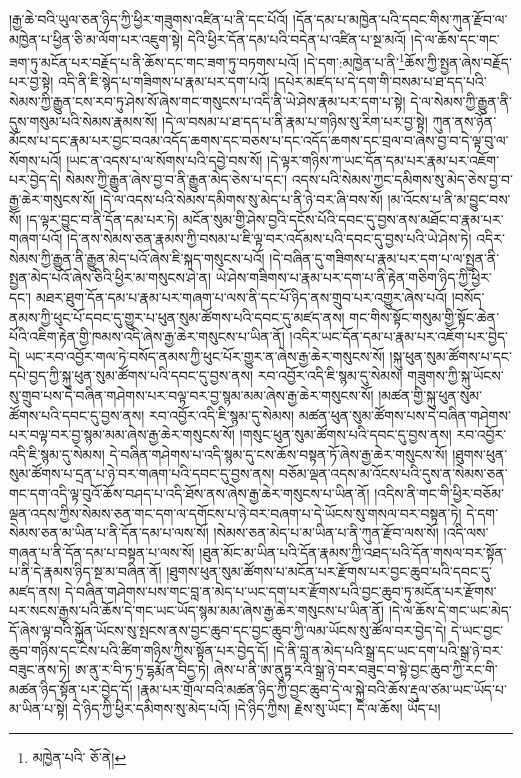 །རྒྱ་ཆེ་བའི་ཡུལ་ཅན་ཉིད་ཀྱི་ཕྱིར་གཟུགས་འཛིན་པ་ནི་དང་པོའོ། །དོན་དམ་པ་མཁྱེན་པའི་དབང་གིས་ཀུན་རྫོབ་ལ་མཁྱེན་པ་ཕྱིན་ཅི་མ་ལོག་པར་འཇུག་སྟེ། དེའི་ཕྱིར་དོན་དམ་པའི་བདེན་པ་འཛིན་པ་སྔ་མའོ། །དེ་ལ་ཆོས་དང་གང་ཟག་ཏུ་མངོན་པར་བརྗོད་པ་ནི་ཆོས་དང་གང་ཟག་ཏུ་བཏགས་པའོ། །དེ་དག་:མཁྱེན་པ་ནི་\footnote{མཁྱེན་པའི་  ཅོ་ནེ། }ཆོས་ཀྱི་སྤྱན་ཞེས་བརྗོད་པར་བྱ་སྟེ། འདི་ནི་ཇི་སྙེད་པ་གཟིགས་པ་རྣམ་པར་དག་པའོ། །དཔེར་མཛད་པ་དེ་དག་གི་བསམ་པ་ཐ་དད་པའི་སེམས་ཀྱི་རྒྱུན་ངས་རབ་ཏུ་ཤེས་སོ་ཞེས་གང་གསུངས་པ་འདི་ནི་ཡེ་ཤེས་རྣམ་པར་དག་པ་སྟེ། དེ་ལ་སེམས་ཀྱི་རྒྱུན་ནི་དུས་གསུམ་པའི་སེམས་རྣམས་སོ། །དེ་ལ་བསམ་པ་ཐ་དད་པ་ནི་རྣམ་པ་གཉིས་སུ་རིག་པར་བྱ་སྟེ། ཀུན་ནས་ཉོན་མོངས་པ་དང་རྣམ་པར་བྱང་བའམ་འདོད་ཆགས་དང་བཅས་པ་དང་འདོད་ཆགས་དང་བྲལ་བ་ཞེས་བྱ་བ་དེ་ལྟ་བུ་ལ་སོགས་པའོ། །ཡང་ན་འདས་པ་ལ་སོགས་པའི་དབྱེ་བས་སོ། །དེ་ལྟར་གཉིས་ཀ་ཡང་དོན་དམ་པར་རྣམ་པར་འཇོག་པར་བྱེད་དེ། སེམས་ཀྱི་རྒྱུན་ཞེས་བྱ་བ་ནི་རྒྱུན་མེད་ཅེས་པ་དང་། འདས་པའི་སེམས་ཀྱང་དམིགས་སུ་མེད་ཅེས་བྱ་བ་རྒྱ་ཆེར་གསུངས་སོ། །དེ་ལ་འདས་པའི་སེམས་དམིགས་སུ་མེད་པ་ནི་ཉེ་བར་ཞི་བས་སོ། །མ་འོངས་པ་ནི་མ་བྱུང་བས་སོ། །ད་ལྟར་བྱུང་བ་ནི་དོན་དམ་པར་ཏེ། མངོན་སུམ་གྱི་ཤེས་བྱའི་དངོས་པོའི་དབང་དུ་བྱས་ནས་མཐོང་བ་རྣམ་པར་གཞག་པའོ། །དེ་ནས་སེམས་ཅན་རྣམས་ཀྱི་བསམ་པ་ཇི་ལྟ་བར་འདོམས་པའི་དབང་དུ་བྱས་པའི་ཡེ་ཤེས་ཏེ། འདིར་སེམས་ཀྱི་རྒྱུན་ནི་རྒྱུན་མེད་པའོ་ཞེས་ཇི་སྐད་གསུངས་པའོ། །དེ་བཞིན་དུ་གཟིགས་པ་རྣམ་པར་དག་པ་ལ་སྤྱན་ནི་སྤྱན་མེད་པའོ་ཞེས་ཅིའི་ཕྱིར་མ་གསུངས་ཤེ་ན། ཡེ་ཤེས་གཟིགས་པ་རྣམ་པར་དག་པ་ནི་རྟེན་གཅིག་ཉིད་ཀྱི་ཕྱིར་དང་། མཐར་ཐུག་དོན་དམ་པ་རྣམ་པར་གཞག་པ་ལས་ནི་དང་པོ་ཉིད་ནས་གྲུབ་པར་འགྱུར་ཞེས་པའོ། །བསོད་ནམས་ཀྱི་ཕུང་པོ་དབང་དུ་གྱུར་པ་ཕུན་སུམ་ཚོགས་པའི་དབང་དུ་མཛད་ནས། གང་གིས་སྟོང་གསུམ་གྱི་སྟོང་ཆེན་པོའི་འཇིག་རྟེན་གྱི་ཁམས་འདི་ཞེས་རྒྱ་ཆེར་གསུངས་པ་ཡིན་ནོ། །འདིར་ཡང་དོན་དམ་པ་རྣམ་པར་འཇོག་པར་བྱེད་དེ། ཡང་རབ་འབྱོར་གལ་ཏེ་བསོད་ནམས་ཀྱི་ཕུང་པོར་གྱུར་ན་ཞེས་རྒྱ་ཆེར་གསུངས་སོ། །སྐུ་ཕུན་སུམ་ཚོགས་པ་དང་དཔེ་བྱད་ཀྱི་སྐུ་ཕུན་སུམ་ཚོགས་པའི་དབང་དུ་བྱས་ནས། རབ་འབྱོར་འདི་ཇི་སྙམ་དུ་སེམས། གཟུགས་ཀྱི་སྐུ་ཡོངས་སུ་གྲུབ་པས་དེ་བཞིན་གཤེགས་པར་བལྟ་བར་བྱ་སྙམ་མམ་ཞེས་རྒྱ་ཆེར་གསུངས་སོ། །མཚན་གྱི་སྐུ་ཕུན་སུམ་ཚོགས་པའི་དབང་དུ་བྱས་ནས། རབ་འབྱོར་འདི་ཇི་སྙམ་དུ་སེམས། མཚན་ཕུན་སུམ་ཚོགས་པས་དེ་བཞིན་གཤེགས་པར་བལྟ་བར་བྱ་སྙམ་མམ་ཞེས་རྒྱ་ཆེར་གསུངས་སོ། །གསུང་ཕུན་སུམ་ཚོགས་པའི་དབང་དུ་བྱས་ནས། རབ་འབྱོར་འདི་ཇི་སྙམ་དུ་སེམས། དེ་བཞིན་གཤེགས་པ་འདི་སྙམ་དུ་ངས་ཆོས་བསྟན་ཏོ་ཞེས་རྒྱ་ཆེར་གསུངས་སོ། །ཐུགས་ཕུན་སུམ་ཚོགས་པ་དྲན་པ་ཉེ་བར་གཞག་པའི་དབང་དུ་བྱས་ནས། བཅོམ་ལྡན་འདས་མ་འོངས་པའི་དུས་ན་སེམས་ཅན་གང་དག་འདི་ལྟ་བུའོ་ཆོས་བཤད་པ་འདི་ཐོས་ནས་ཞེས་རྒྱ་ཆེར་གསུངས་པ་ཡིན་ནོ། །འདིས་ནི་གང་གི་ཕྱིར་བཅོམ་ལྡན་འདས་ཀྱིས་སེམས་ཅན་གང་དག་ལ་དགོངས་པ་ཉེ་བར་བཞག་པ་དེ་ཡོངས་སུ་གསལ་བར་བསྟན་ཏེ། དེ་དག་སེམས་ཅན་མ་ཡིན་པ་ནི་དོན་དམ་པ་ལས་སོ། །སེམས་ཅན་མེད་པ་མ་ཡིན་པ་ནི་ཀུན་རྫོབ་ལས་སོ། །འདི་ལས་གཞན་པ་ནི་དོན་དམ་པ་བསྟན་པ་ལས་སོ། །ཐུན་མོང་མ་ཡིན་པའི་དོན་རྣམས་ཀྱི་འཐད་པའི་དོན་གསལ་བར་སྟོན་པ་ནི་དེ་རྣམས་ཉིད་སྔ་མ་བཞིན་ནོ། །ཐུགས་ཕུན་སུམ་ཚོགས་པ་མངོན་པར་རྫོགས་པར་བྱང་ཆུབ་པའི་དབང་དུ་མཛད་ནས། དེ་བཞིན་གཤེགས་པས་གང་བླ་ན་མེད་པ་ཡང་དག་པར་རྫོགས་པའི་བྱང་ཆུབ་ཏུ་མངོན་པར་རྫོགས་པར་སངས་རྒྱས་པའི་ཆོས་དེ་གང་ཡང་ཡོད་སྙམ་མམ་ཞེས་རྒྱ་ཆེར་གསུངས་པ་ཡིན་ནོ། །དེ་ལ་ཆོས་དེ་གང་ཡང་མེད་དོ་ཞེས་ལྟ་བའི་སྐྱོན་ཡོངས་སུ་སྤངས་ནས་བྱང་ཆུབ་དང་བྱང་ཆུབ་ཀྱི་ལམ་ཡོངས་སུ་ཚོལ་བར་བྱེད་དེ། དེ་ཡང་བྱང་ཆུབ་གཉིས་དང་ངེས་པའི་ཚིག་གཉིས་ཀྱིས་སྟོན་པར་བྱེད་དོ། །དེ་ནི་བླ་ན་མེད་པའི་སྒྲ་དང་ཡང་དག་པའི་སྒྲ་ཉེ་བར་བཟུང་ནས་ཏེ། ཨ་ནུ་ར་བི་ཏ་ཏྲ་དྷརྨོ་ན་བིདྱ་ཏེ། ཞེས་པ་ནི་ཨ་ནུཏྟ་རའི་སྒྲ་ཉེ་བར་བཟུང་བ་སྟེ་བྱང་ཆུབ་ཀྱི་རང་གི་མཚན་ཉིད་སྟོན་པར་བྱེད་དོ། །རྣམ་པར་གྲོལ་བའི་མཚན་ཉིད་ཀྱི་བྱང་ཆུབ་དེ་ལ་སྐྱེ་བའི་ཆོས་རྡུལ་ཙམ་ཡང་ཡོད་པ་མ་ཡིན་པ་སྟེ། དེ་ཉིད་ཀྱི་ཕྱིར་དམིགས་སུ་མེད་པའོ། །དེ་ཉིད་ཀྱིས། རྗེས་སུ་ཡོང་། དེ་ལ་ཆོས། ཡོད་པ། 